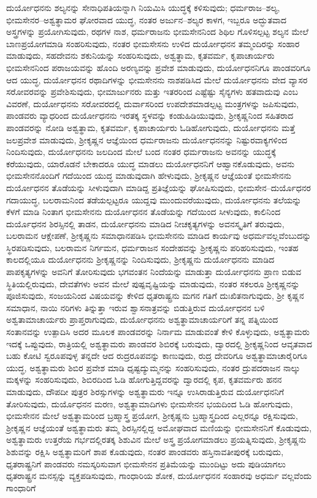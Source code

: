 ದುರ್ಯೋಧನನು ಶಲ್ಯನನ್ನು ಸೇನಾಧಿಪತಿಯನ್ನಾಗಿ ನಿಯಮಿಸಿ ಯುದ್ಧಕ್ಕೆ ಕಳಿಸುವುದು; ಧರ್ಮರಾಜ–ಶಲ್ಯ, ಭೀಮಸೇನರ–ಅಶ್ವತ್ಥಾಮರ ಘೋರವಾದ ಯುದ್ಧ, ನಂತರ ಅರ್ಜುನ–ಶಲ್ಯರ ಕಾಳಗ, ಇಬ್ಬರೂ ಅದ್ಭುತವಾದ ಅಸ್ತ್ರಗಳನ್ನು ಪ್ರಯೋಗಿಸುವುದು, ರಥಗಳ ನಾಶ, ಧರ್ಮರಾಜನು ಭೀಮಸೇನನಿಂದ ಶಿಥಿಲ ಗೊಳಿಸಲ್ಪಟ್ಟ ಶಲ್ಯನ ಮೇಲೆ ಬಾಣಪ್ರಯೋಗಮಾಡಿ ಸಂಹರಿಸುವುದು, ನಂತರ ಭೀಮಸೇಸನು ಉಳಿದ ದುರ್ಯೋಧನನ ತಮ್ಮಂದಿರನ್ನು ಸಂಹಾರ ಮಾಡುವುದು, ಸಹದೇವನು ಶಕುನಿಯನ್ನು ಸಂಹರಿಸುವುದು, ಅಶ್ವತ್ಥಾಮ, ಕೃತವರ್ಮ, ಕೃಪಾಚಾರ್ಯರು ಭೀಮಸೇನನಿಂದ ಪರಾಜಯವನ್ನು ಹೊಂದಿ ಅರಣ್ಯವನ್ನು ಪ್ರವೇಶ ಮಾಡುವುದು, ದುರ್ಯೋಧನನಿಗೂ ಪಾಂಡವರಿಗೂ ಆದ ಯುದ್ಧ, ದುರ್ಯೋಧನನ ರಥಾದಿಗಳನ್ನು ಭೀಮಸೇನನು ನಾಶಪಡಿಸಿದ ಮೇಲೆ ದುರ್ಯೋಧನನು ವೇದ ವ್ಯಾಸರ ಸರೋವರವನ್ನು ಪ್ರವೇಶಿಸುವುದು, ಭೀಮಾರ್ಜುನರು ಮತ್ತು ಇತರರಿಂದ ಎಷ್ಟೆಷ್ಟು ಸೈನ್ಯಗಳು ಹತವಾದುವು ಎಂಬ ವಿವರಣೆ, ದುರ್ಯೋಧನನು ಸರೋವರದಲ್ಲಿ ದುರ್ವಾಸರಿಂದ ಉಪದೇಶಮಾಡಲ್ಪಟ್ಟ ಮಂತ್ರಗಳನ್ನು ಜಪಿಸುವುದು, ಪಾಂಡವರು ವ್ಯಾಧರಿಂದ ದುರ್ಯೋಧನನು ಇರತಕ್ಕ ಸ್ಥಳವನ್ನು ಕಂಡುಹಿಡಿಯುವುದು, ಶ‍್ರೀಕೃಷ್ಣನಿಂದ ಸಹಿತರಾದ ಪಾಂಡವರನ್ನು ನೋಡಿ ಅಶ್ವತ್ಥಾಮ, ಕೃತವರ್ಮ, ಕೃಪಾಚಾರ್ಯರು ಓಡಿಹೋಗುವುದು, ದುರ್ಯೋಧನನು ಮತ್ತೆ ಜಲಪ್ರವೇಶ ಮಾಡುವುದು, ಶ‍್ರೀಕೃಷ್ಣನ ಆಜ್ಞೆಯಿಂದ ಧರ್ಮರಾಜನು ದುರ್ಯೋಧನನನ್ನು ನಿಷ್ಟುರವಾಕ್ಯಗಳಿಂದ ನಿಂದಿಸುವುದು, ದುರ್ಯೋಧನನು ಜಲದಿಂದ ಮೇಲೆ ಬಂದ ನಂತರ ಧರ್ಮರಾಜನು ಅವನನ್ನು ಯುದ್ಧಕ್ಕೆ ಕರೆಯುವುದು, ಯಾರೊಡನೆ ಬೇಕಾದರೂ ಯುದ್ಧ ಮಾಡಲು ದುರ್ಯೋಧನನಿಗೆ ಆಹ್ವಾನಕೊಡುವುದು, ಅವನು ಭೀಮಸೇನನೊಂದಿಗೆ ಗದೆಯಿಂದ ಯುದ್ಧ ಮಾಡುವುದಾಗಿ ಹೇಳುವುದು, ಶ‍್ರೀಕೃಷ್ಣನ ಆಜ್ಞೆಯಂತೆ ಭೀಮಸೇನನು ದುರ್ಯೋಧನನ ತೊಡೆಯನ್ನು ಸೀಳುವುದಾಗಿ ಮಾಡಿದ್ದ ಪ್ರತಿಜ್ಞೆಯನ್ನು ಘೋಷಿಸುವುದು, ಭೀಮಸೇನ–ದುರ್ಯೊಧನರ ಗದಾಯುದ್ಧ, ಬಲರಾಮನಿಂದ ತಡೆಯಲ್ಪಟ್ಟರೂ ಯುದ್ದವು ಮುಂದುವರೆಯುವುದು, ದುರ್ಯೋಧನನು ತಲೆಯನ್ನು ಕೆಳಗೆ ಮಾಡಿ ನಿಂತಾಗ ಭೀಮಸೇನನು ದುರ್ಯೋಧನನ ತೊಡೆಯನ್ನು ಗದೆಯಿಂದ ಸೀಳುವುದು, ಕಾಲಿನಿಂದ ದುರ್ಯೊಧನನ ಶಿರಸ್ಸಿನಲ್ಲಿ ತಾಡನ, ದುರ್ಯೋಧನನು ಮಾಡಿದ ನೀಚಕೃತ್ಯಗಳನ್ನು ಅವನಸ್ಕೃತಿಗೆ ತರುವುದು, ಬಲರಾಮನ ಆಕ್ಷೇಪಣೆ, ಶ‍್ರೀಕೃಷ್ಣನು ಸಮಾಧಾನಪಡಿಸಿ ಭೀಮಸೇನನು ಮಾಡಿದ ಕಾರ್ಯವು ಅಧರ್ಮವಲ್ಲವೆಂಬುದನ್ನು ಸ್ಥಿರಪಡಿಸುವುದು, ಬಲರಾಮನ ನಿರ್ಗಮನ, ಧರ್ಮರಾಜನ ಸಂದೇಹವನ್ನು ಶ‍್ರೀಕೃಷ್ಣನು ಪರಿಹರಿಸುವುದು, ಇಂತಹ ಕಾಲದಲ್ಲಿಯೂ ದುರ್ಯೋಧನನು ಶ‍್ರೀಕೃಷ್ಣನನ್ನು ನಿಂದಿಸುವುದು, ಶ‍್ರೀಕೃಷ್ಣನು ದುರ್ಯೋಧನನು ಮಾಡಿದ ಪಾಪಕೃತ್ಯಗಳನ್ನು ಅವನಿಗೆ ತೋರಿಸುವುದು ಭಗವಂತನ ನಿಂದೆಯನ್ನು ಮಾಡುತ್ತಾ ದುರ್ಯೋಧನನು ಪ್ರಾಣ ಬಿಡುವ ಸ್ಥಿತಿಯಲ್ಲಿರುವುದು, ದೇವತೆಗಳು ಅವನ ಮೇಲೆ ಪುಷ್ಪವೃಷ್ಟಿಯನ್ನು ಮಾಡುವುದು, ನಂತರ ಸಕಲರೂ ಶ‍್ರೀಕೃಷ್ಣನನ್ನು ಪೂಜಿಸುವುದು, ಸಂಜಯನಿಂದ ವಿಷಯವನ್ನು ಕೇಳಿದ ಧೃತರಾಷ್ಟ್ರನು ಮಗನ ಗತಿಗೆ ದುಃಖಿತನಾಗುವುದು, ಶ‍್ರೀ ಕೃಷ್ಣನ ಸಮಾಧಾನ, ನಾಯಿ ನರಿಗಳು ತಿನ್ನುತ್ತಾ ಇರುವ ಶ್ವಾಸನಾತ್ರವನ್ನು ಬಿಡುತ್ತಿರುವ ದುರ್ಯೋಧನನ ಬಳಿ ಅಶ್ವತಾಮಾಚಾರ್ಯರು ಪ್ರಾಪ್ತರಾಗುವುದು, ದುರ್ಯೋಧನನು ಅಶ್ವತ್ಥಾಮಾಚಾರ್ಯರಿಗೆ ತನ್ನ ಪತ್ನಿಯಿಂದ ಸಂತಾನವನ್ನು ಉತ್ಪಾದಿಸಿ ಅದರ ಮೂಲಕ ಪಾಂಡವರನ್ನು ನಿರ್ನಾಮ ಮಾಡುವಂತೆ ಕೇಳಿ ಕೊಳ್ಳುವುದು, ಅಶ್ವತ್ಥಾಮರು ಇದಕ್ಕೆ ಒಪ್ಪುವುದು, ರಾತ್ರಿಯಲ್ಲಿ ಅಶ್ವತ್ಥಾಮರು ಪಾಂಡವರ ಶಿಬಿರಕ್ಕೆ ಬರುವುದು, ದ್ವಾರದಲ್ಲಿ ಶ‍್ರೀಕೃಷ್ಣನಿಂದ ಆವೃತವಾದ ಬಹು ಕೋಟಿ ಸ್ವರೂಪವುಳ್ಳ ತನ್ನದೇ ಆದ ರುದ್ರರೂಪವನ್ನು ಕಾಣುವುದು, ರುದ್ರ ದೇವರಿಗೂ ಅಶ್ವತ್ಥಾಮಾಚಾರೈರಿಗೂ ಯುದ್ಧ, ಅಶ್ವತ್ಥಾಮರು ಶಿಬಿರ ಪ್ರವೇಶ ಮಾಡಿ ಧೃಷ್ಟದ್ಯುಮ್ಮನನ್ನು ಸಂಹರಿಸುವುದು, ನಂತರ ದ್ರುಪದರಾಜನ ನಾಲ್ಕು ಮಕ್ಕಳನ್ನು ಸಂಹರಿಸುವುದು, ಶಿಬಿರದಿಂದ ಓಡಿ ಹೋಗುತ್ತಿದ್ದವರನ್ನು ದ್ವಾರದಲ್ಲಿ ಕೃಪ, ಕೃತವರ್ಮರು ಹನನ ಮಾಡುವುದು, ದೌಪದೀ ಪುತ್ರರ ಶಿರಸ್ಸುಗಳನ್ನು ಅಶ್ವತ್ಥಾಮರು ಇನ್ನೂ ಉಸಿರಾಡುತ್ತಿರುವ ದುರ್ಯೋಧನನಿಗೆ ತೋರಿಸುವುದು, ದುರ್ಯೊಧನನ ಮರಣ, ಅಶ್ವತ್ಥಾಮಾದಿಗಳು ಭೀಮಸೇನನ ಭಯದಿಂದ ಓಡಿ ಹೋಗುವುದು, ಭೀಮಸೇನನ ಮೇಲೆ ಅಶ್ವತ್ಥಾಮರಿಂದ ಬ್ರಹ್ಮಾಸ್ತ್ರ ಪ್ರಯೋಗ, ಶ‍್ರೀಕೃಷ್ಣನು ಬ್ರಹ್ಮಾಸ್ತ್ರದಿಂದ ಎಲ್ಲರನ್ನೂ ರಕ್ಷಿಸುವುದು, ಶ‍್ರೀಕೃಷ್ಣನ ಆಜ್ಞೆಯಂತೆ ಅಶ್ವತ್ಥಾಮರು ತಮ್ಮ ಶಿರಸ್ಸಿನಲ್ಲಿದ್ದ ಅಮೋಘವಾದ ಮಣಿಯನ್ನು ಭೀಮಸೇನನಿಗೆ ಕೊಡುವುದು, ಅಶ್ವತ್ಥಾಮರು ಉತ್ತರೆಯ ಗರ್ಭದಲ್ಲಿರತಕ್ಕ ಶಿಶುವಿನ ಮೇಲೆ ಅಸ್ತ್ರ ಪ್ರಯೋಗಮಾಡಲು ಪ್ರಯತ್ನಿಸುವುದು, ಶ‍್ರೀಕೃಷ್ಣನು ಶಿಶುವನ್ನು ರಕ್ಷಿಸಿ ಅಶ್ವತ್ಥಾಮರಿಗೆ ಶಾಪ ಕೊಡುವುದು, ನಂತರ ಪಾಂಡವರು ಹಸ್ತಿನಾವತೀಪುರಕ್ಕೆ ಬರುವುದು, ಧೃತರಾಷ್ಟ್ರನಿಗೆ ಪಾಂಡವರು ನಮಸ್ಕರಿಸುವಾಗ ಭೀಮಸೇನನ ಪ್ರತಿಮೆಯನ್ನು ಮುಂದಿಟ್ಟು ಅದು ಪುಡಿಯಾಗಲು ಧೃತರಾಷ್ಟ್ರನ ಮನಸ್ಸನ್ನು ವ್ಯಕ್ತಪಡಿಸುವುದು, ಗಾಂಧಾರಿಯ ಶೋಕ, ದುರ್ಯೋಧನನ ಸಂಹಾರವು ಅಧರ್ಮ ವಲ್ಲವೆಂದು ಗಾಂಧಾರಿಗೆ 